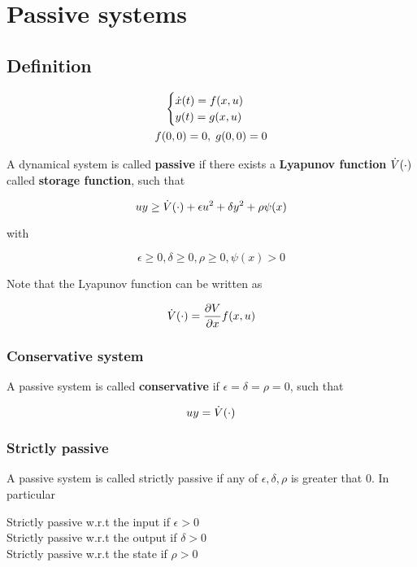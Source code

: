 \chapter{Passive systems}

\section{Definition}

\begin{gather*}
    \begin{cases}
        \dot{x} (t) = f(x,u) \\
        y(t) = g(x,u)
    \end{cases} \\
    f(0,0)=0, \; g(0,0)=0
\end{gather*}

A dynamical system is called \textbf{passive} if there exists a \textbf{Lyapunov function} $\dot{V}(\cdot)$ called \textbf{storage function}, such that

\[
    uy \geq \dot{V} (\cdot) + \epsilon u^2 + \delta y^2 + \rho \psi(x)
\]

with

\[
    \epsilon \geq 0, \delta \geq 0, \rho \geq 0, \psi(x) > 0
\]

Note that the Lyapunov function can be written as

\[
    \dot{V}(\cdot) = \frac{\partial V}{\partial x} f(x,u)
\]

\subsection{Conservative system}

A passive system is called \textbf{conservative} if $\epsilon = \delta = \rho = 0$, such that

\[
    uy = \dot{V} (\cdot)
\]

\subsection{Strictly passive}

A passive system is called strictly passive if any of $\epsilon, \delta, \rho$ is greater that $0$.
In particular

Strictly passive w.r.t the input if $\epsilon > 0$ \\
Strictly passive w.r.t the output if $\delta > 0$ \\
Strictly passive w.r.t the state if $\rho > 0$

